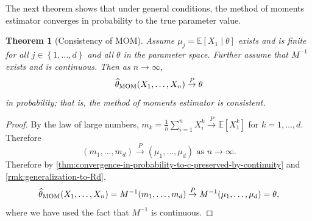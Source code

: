 \documentclass[10pt]{article}
\newtheorem{theorem}{Theorem}
\theoremstyle{definition}
\newcommand{\vt}{\vskip 5mm} %
\newcommand{\Fl}{\vt\noindent\textbf} %
\newcommand{\1}[1]{\textbf{1}_{\left[#1\right]}} %
\def\E{\mathbb{E}} %
\begin{document}
The next theorem shows that under general conditions, the method of moments
estimator converges in probability to the true parameter value.
\begin{theorem}[Consistency of MOM]
  \label{thm:consistency-of-MOM}
  Assume $\mu_{j}= \E[X_{1}\mid \theta ]$ exists and is finite for all
  $j\in \left\{1,\ldots,d\right\}$ and all $\theta$ in the parameter space.
  Further assume that $M^{-1}$ exists and is continuous. Then as
  $n \to \infty$,
  \begin{equation*}
    \widehat{\theta}_{\rm MOM}(X_{1},\ldots,X_{n}) \overset{P}{\to} \theta
  \end{equation*}
  in probability; that is, the method of moments estimator is consistent.
\end{theorem}
\begin{proof}
  By the law of large numbers, $m_{k} = \frac{1}{n}\sum_{i=1}^{n} X_{i}^{k}
  \overset{P}{\to} \E\left[X^{k}_{1} \right]$ for $k=1,\ldots,d$. Therefore
  \begin{equation*}
    (m_{1},\ldots,m_{d}) \overset{P}{\to} (\mu_{1},\ldots,\mu_{d}) \text{ as }n \to \infty.
  \end{equation*}
  Therefore by
  \cref{thm:convergence-in-probability-to-c-preserved-by-continuity} and
  \cref{rmk:generalization-to-Rd},
  \begin{equation*}
    \widehat{\theta}_{\rm MOM}(X_{1},\ldots,X_{n}) = M^{-1}(m_{1},\ldots,m_{d}) \overset{P}{\to} M^{-1}(\mu_{1},\ldots,\mu_{d}) = \theta,
  \end{equation*}
  where we have used the fact that $M^{-1}$ is continuous.
\end{proof}







\newpage
\end{document}
